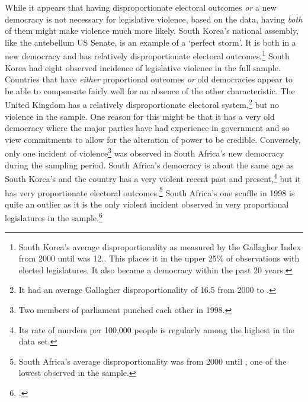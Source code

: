 \documentclass[a4paper]{article}\usepackage[]{graphicx}\usepackage[]{color}
\begin{document}
While it appears that having disproportionate electoral outcomes \emph{or} a new democracy is not necessary for legislative violence, based on the data, having \emph{both} of them might make violence much more likely. South Korea's national assembly, like the antebellum US Senate, is an example of a `perfect storm'. It is both in a new democracy and has relatively disproportionate electoral outcomes.\footnote{South Korea’s average disproportionality as measured by the Gallagher Index \citep{Gallagher1991} from 2000 until  was 12.. This places it in the upper 25\% of observations with elected legislatures. It also became a democracy within the past 20 years.} South Korea had eight observed incidence of legislative violence in the full sample. Countries that have \emph{either} proportional outcomes \emph{or} old democracies appear to be able to compensate fairly well for an absence of the other characteristic. The United Kingdom has a relatively disproportionate electoral system,\footnote{It had an average Gallagher disproportionality of 16.5 from 2000 to .} but no violence in the sample. One reason for this might be that it has a very old democracy where the major parties have had experience in government and so view commitments to allow for the alteration of power to be credible. Conversely, only one incident of violence\footnote{Two members of parliament punched each other in 1998.} was observed in South Africa's new democracy during the sampling period. South Africa's democracy is about the same age as South Korea's and the country has a very violent recent past and present,\footnote{Its rate of murders per 100,000 people is regularly among the highest in the \cite{UNMurder2013} data set.} but it has very proportionate electoral outcomes.\footnote{South Africa’s average disproportionality was  from 2000 until , one of the lowest observed in the sample.} South Africa's one scuffle in 1998 is quite an outlier as it is the only violent incident observed in very proportional legislatures in the sample.\footnote{ \citep{Guardian2015}. }
\end{document}
